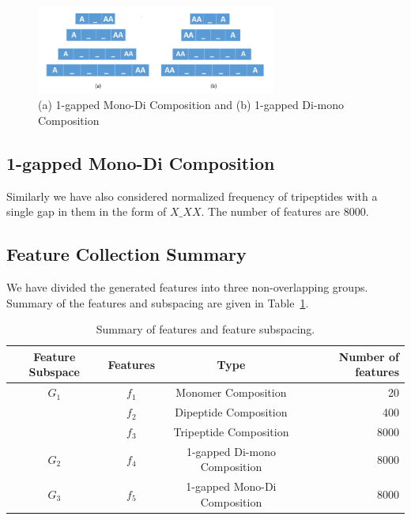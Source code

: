 \begin{figure}[H]
\centering
 \includegraphics[width=0.7\textwidth]{comGap.PNG}
 \caption{(a) 1-gapped Mono-Di Composition and (b) 1-gapped Di-mono Composition}
\end{figure}

\subsection{1-gapped Mono-Di Composition}
Similarly we have also considered normalized frequency of tripeptides with a single gap in them in the form of $X\_XX$. The number of features are 8000.

\subsection{Feature Collection Summary}
We have divided the generated features into three non-overlapping groups. Summary of the features and subspacing are given in Table~\ref{tab:features}.

\begin{table}[h]
    \centering
    \begin{tabular}{c| c| c| r}
        Feature Subspace & Features & Type & Number of features \\
        \hline
        $G_1$ & $f_1$ & Monomer Composition & 20\\
        & $f_2$& Dipeptide Composition & 400\\
        & $f_3$& Tripeptide Composition & 8000\\
        \hline 
        $G_2$ & $f_4$ & 1-gapped Di-mono Composition & 8000\\
        \hline 
        $G_3$ & $f_5$ & 1-gapped Mono-Di Composition & 8000\\
    \end{tabular}
    \caption{Summary of features and feature subspacing.    \label{tab:features}}

\end{table}

